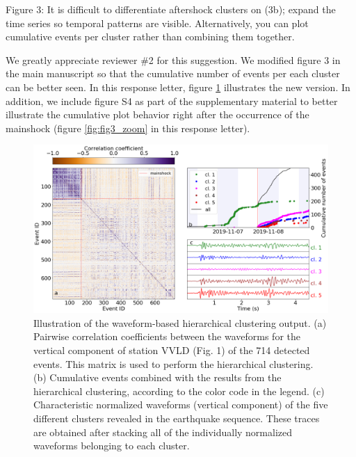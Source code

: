\documentclass[10pt]{extarticle}
\begin{document}
\begin{ReviewerComment}{2}
\noindent 
Figure 3: It is difficult to differentiate aftershock clusters on (3b); expand the time series so temporal patterns are visible. Alternatively, you can plot cumulative events per cluster rather than combining them together.  

\end{ReviewerComment}


\begin{Answer}
We greatly appreciate reviewer \#2 for this suggestion. We modified figure 3 in the main manuscript so that the cumulative number of events per each cluster can be better seen. In this response letter, figure \ref{fig:fig3_improved} illustrates the new version. In addition, we include figure S4 as part of the supplementary material to better illustrate the cumulative plot behavior right after the occurrence of the mainshock (figure \ref{fig:fig3_zoom} in this response letter). 
\begin{figure}[!h]
\begin{center}
 \includegraphics[width=1\linewidth]{wigg_cc_mat_cluster.png} 
 \caption{Illustration of the waveform-based hierarchical clustering output. (a) Pairwise correlation coefficients between the waveforms for the vertical component of station VVLD (Fig. 1) of the 714 detected events. This matrix is used to perform the hierarchical clustering. (b) Cumulative events combined with the results from the hierarchical clustering, according to the color code in the legend. (c) Characteristic normalized waveforms (vertical component) of the five different clusters revealed in the earthquake sequence. These traces are obtained after stacking all of the individually normalized waveforms belonging to each cluster.}
\end{center}
\label{fig:fig3_improved}

\end{figure}
\end{Answer}
\end{document}
